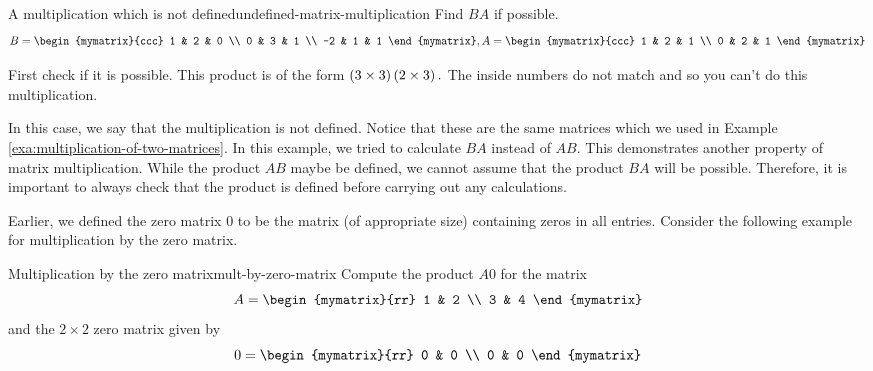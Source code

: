 \begin{example}{A multiplication which is not defined}{undefined-matrix-multiplication}
Find $BA$ if possible.
\begin{equation*}
B = \begin{mymatrix}{ccc}
1 & 2 & 0 \\
0 & 3 & 1 \\
-2 & 1 & 1
\end{mymatrix},  A = \begin{mymatrix}{ccc}
1 & 2 & 1 \\
0 & 2 & 1
\end{mymatrix}
\end{equation*}
\end{example}

\begin{solution} First check if it is possible. This product is of the form $\left(3\times 3\right)
\left(2\times 3\right) .$ The inside numbers do not match and so you can't
do this multiplication. 
\end{solution}

In this case, we say that the multiplication is not defined. 
Notice that these are the same matrices which we used in Example \ref{exa:multiplication-of-two-matrices}.
In this example, we tried to calculate $BA$ instead of $AB$. This demonstrates another property 
of matrix multiplication. While the product $AB$ maybe be defined, we cannot assume that
the product $BA$ will be possible. Therefore, it is important to always check that the product is defined
before carrying out any calculations.

Earlier, we defined the zero matrix $0$ to be the matrix (of
appropriate size) containing zeros in all entries.  Consider the
following example for multiplication by the zero matrix.

\begin{example}{Multiplication by the zero matrix}{mult-by-zero-matrix}
Compute the product $A0$ for the matrix
\begin{equation*}
A=
\begin{mymatrix}{rr}
1 & 2 \\
3 & 4
\end{mymatrix}
\end{equation*}
and the $2 \times 2$ zero matrix given by
\begin{equation*}
0=
\begin{mymatrix}{rr}
0 & 0 \\
0 & 0
\end{mymatrix}
\end{equation*}
\end{example}

